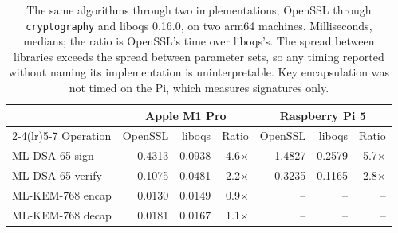 \begin{table}[t]
\caption{The same algorithms through two implementations, OpenSSL through \texttt{cryptography} and liboqs 0.16.0, on two arm64 machines. Milliseconds, medians; the ratio is OpenSSL's time over liboqs's. The spread between libraries exceeds the spread between parameter sets, so any timing reported without naming its implementation is uninterpretable. Key encapsulation was not timed on the Pi, which measures signatures only.}
\label{tab:backends}
\begin{tabular}{lrrrrrr}
\toprule
 & \multicolumn{3}{c}{Apple M1 Pro} & \multicolumn{3}{c}{Raspberry Pi 5}\\
\cmidrule(lr){2-4}\cmidrule(lr){5-7}
Operation & OpenSSL & liboqs & Ratio & OpenSSL & liboqs & Ratio\\
\midrule
ML-DSA-65 sign & 0.4313 & 0.0938 & 4.6$\times$ & 1.4827 & 0.2579 & 5.7$\times$\\
ML-DSA-65 verify & 0.1075 & 0.0481 & 2.2$\times$ & 0.3235 & 0.1165 & 2.8$\times$\\
ML-KEM-768 encap & 0.0130 & 0.0149 & 0.9$\times$ & -- & -- & --\\
ML-KEM-768 decap & 0.0181 & 0.0167 & 1.1$\times$ & -- & -- & --\\
\bottomrule
\end{tabular}
\end{table}

